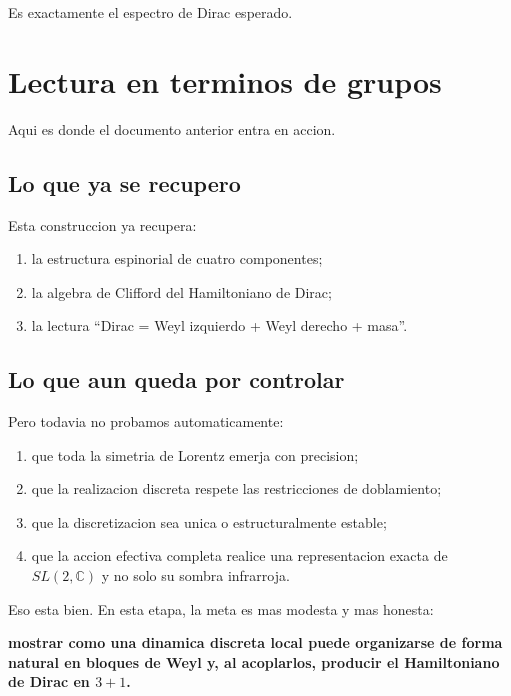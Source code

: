 Es exactamente el espectro de Dirac esperado.

\section{Lectura en terminos de grupos}

Aqui es donde el documento anterior entra en accion.

\subsection{Lo que ya se recupero}

Esta construccion ya recupera:

\begin{enumerate}[leftmargin=*]
  \item la estructura espinorial de cuatro componentes;
  \item la algebra de Clifford del Hamiltoniano de Dirac;
  \item la lectura \enquote{Dirac = Weyl izquierdo + Weyl derecho + masa}.
\end{enumerate}

\subsection{Lo que aun queda por controlar}

Pero todavia no probamos automaticamente:

\begin{enumerate}[leftmargin=*]
  \item que toda la simetria de Lorentz emerja con precision;
  \item que la realizacion discreta respete las restricciones de doblamiento;
  \item que la discretizacion sea unica o estructuralmente estable;
  \item que la accion efectiva completa realice una representacion exacta de \(SL(2,\mathbb{C})\) y no solo su sombra infrarroja.
\end{enumerate}

Eso esta bien. En esta etapa, la meta es mas modesta y mas honesta:

\begin{displayquote}
\textbf{mostrar como una dinamica discreta local puede organizarse de forma natural en bloques de Weyl y, al acoplarlos, producir el Hamiltoniano de Dirac en \(3+1\).}
\end{displayquote}

